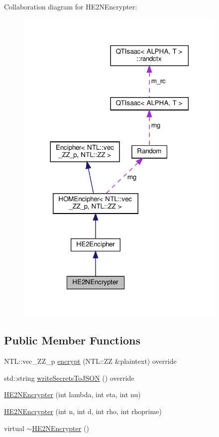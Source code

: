 Collaboration diagram for H\+E2\+N\+Encrypter\+:
\nopagebreak
\begin{figure}[H]
\begin{center}
\leavevmode
\includegraphics[width=288pt]{classHE2NEncrypter__coll__graph}
\end{center}
\end{figure}
\subsection*{Public Member Functions}
\begin{DoxyCompactItemize}
\item 
N\+T\+L\+::vec\+\_\+\+Z\+Z\+\_\+p \hyperlink{classHE2NEncrypter_aa7ae559f2407b7a5527bd42470224e1b}{encrypt} (N\+T\+L\+::\+ZZ \&plaintext) override
\item 
std\+::string \hyperlink{classHE2NEncrypter_a720d4ee52dadd55f61631554d2942a6b}{write\+Secrets\+To\+J\+S\+ON} () override
\item 
\hyperlink{classHE2NEncrypter_aa71432cbbe9565717fc5af638649d8d8}{H\+E2\+N\+Encrypter} (int lambda, int eta, int nu)
\item 
\hyperlink{classHE2NEncrypter_a3cb8269ce3f3de2f9a12d350366b36f9}{H\+E2\+N\+Encrypter} (int n, int d, int rho, int rhoprime)
\item 
virtual \hyperlink{classHE2NEncrypter_aa5ed36da105b7f9e4fa5fba012e37b0a}{$\sim$\+H\+E2\+N\+Encrypter} ()
\end{DoxyCompactItemize}
